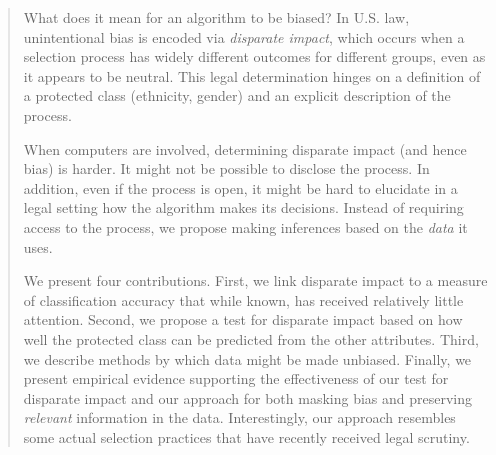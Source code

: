 
\begin{abstract}
What does it mean for an algorithm to be biased? 
%
In U.S. law, unintentional bias is encoded via
\emph{disparate impact}, which occurs when a selection process has widely different outcomes for different groups, even as it appears to be neutral. This legal determination hinges on a definition of a protected class (ethnicity, gender) and an explicit description of the process.

When computers are involved, 
determining disparate impact (and hence bias) is harder. It
might not be possible to disclose the process. In addition,
even if the process is
open, it might be hard to elucidate in a legal setting how the algorithm makes its decisions. Instead of requiring access to the process, we propose making
inferences based on the \emph{data} it uses.

We present four contributions. First, we link disparate impact
to a measure of classification accuracy that while known,
has received relatively little attention.
Second, we propose a test for disparate impact based on
how well the protected class can be predicted from the other attributes.
Third, we describe methods by which data might be made unbiased.  Finally, we present empirical evidence supporting the effectiveness of our test for disparate impact and our approach for both masking bias and preserving \emph{relevant} information in the data.  Interestingly, our approach resembles some actual selection practices that have recently received legal scrutiny.

\end{abstract}

